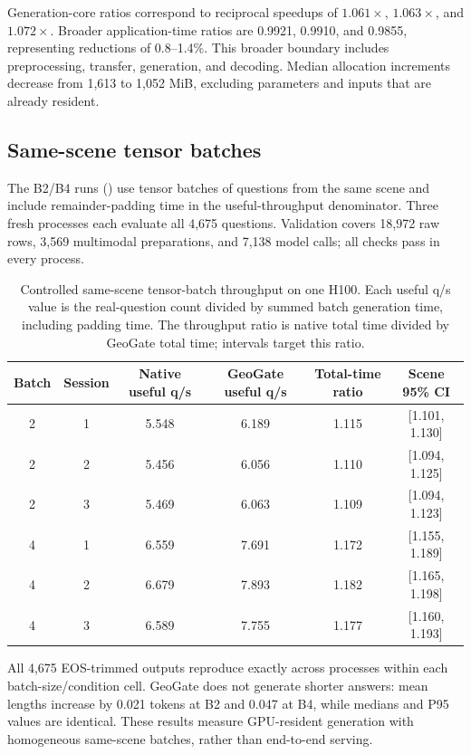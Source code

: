 Generation-core ratios correspond to reciprocal speedups of $1.061\times$, $1.063\times$, and $1.072\times$. Broader application-time ratios are 0.9921, 0.9910, and 0.9855, representing reductions of 0.8--1.4\%. This broader boundary includes preprocessing, transfer, generation, and decoding. Median allocation increments decrease from 1,613 to 1,052 MiB, excluding parameters and inputs that are already resident.

\subsection{Same-scene tensor batches}
The B2/B4 runs () use tensor batches of questions from the same scene and include remainder-padding time in the useful-throughput denominator. Three fresh processes each evaluate all 4,675 questions. Validation covers 18,972 raw rows, 3,569 multimodal preparations, and 7,138 model calls; all checks pass in every process.

\begin{table}[t]
\centering
\caption{Controlled same-scene tensor-batch throughput on one H100. Each useful q/s value is the real-question count divided by summed batch generation time, including padding time. The throughput ratio is native total time divided by GeoGate total time; intervals target this ratio.}
\label{tab:supp_batch}
\begin{tabular}{cccccc}
\toprule
Batch & Session & Native useful q/s & GeoGate useful q/s & Total-time ratio & Scene 95\% CI \\
\midrule
2 & 1 & 5.548 & 6.189 & 1.115 & [1.101, 1.130] \\
2 & 2 & 5.456 & 6.056 & 1.110 & [1.094, 1.125] \\
2 & 3 & 5.469 & 6.063 & 1.109 & [1.094, 1.123] \\
4 & 1 & 6.559 & 7.691 & 1.172 & [1.155, 1.189] \\
4 & 2 & 6.679 & 7.893 & 1.182 & [1.165, 1.198] \\
4 & 3 & 6.589 & 7.755 & 1.177 & [1.160, 1.193] \\
\bottomrule
\end{tabular}
\end{table}

All 4,675 EOS-trimmed outputs reproduce exactly across processes within each batch-size/condition cell. GeoGate does not generate shorter answers: mean lengths increase by 0.021 tokens at B2 and 0.047 at B4, while medians and P95 values are identical. These results measure GPU-resident generation with homogeneous same-scene batches, rather than end-to-end serving.


